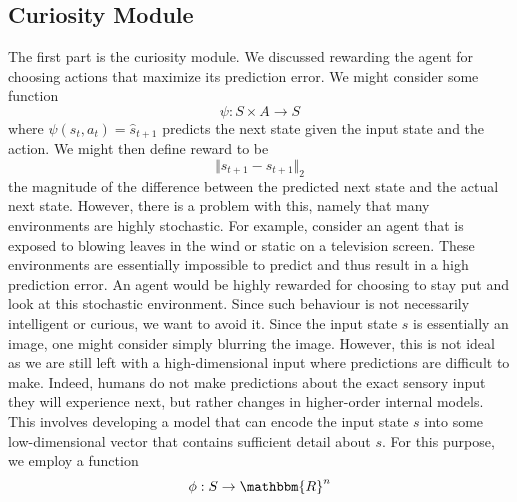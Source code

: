 \documentclass[conference, 12pt]{IEEEtran} %
\begin{document}
	\subsection{Curiosity Module}
	\par The first part is the curiosity module. We discussed rewarding the agent for choosing actions that maximize its prediction error. We might consider some function
	$$
	\psi : S \times A \to S
	$$
	where $\psi(s_t, a_t) = \hat{s}_{t+1} $ predicts the next state given the input state and the action. We might then define reward to be
	$$
	\Vert s_{t+1} - \hat{s}_{t+1} \Vert _2
	$$
	the magnitude of the difference between the predicted next state and the actual next state. However, there is a problem with this, namely that many environments are highly stochastic. For example, consider an agent that is exposed to blowing leaves in the wind or static on a television screen. These environments are essentially impossible to predict and thus result in a high prediction error. An agent would be highly rewarded for choosing to stay put and look at this stochastic environment. Since such behaviour is not necessarily intelligent or curious, we want to avoid it. Since the input state $s$ is essentially an image, one might consider simply blurring the image. However, this is not ideal as we are still left with a high-dimensional input where predictions are difficult to make. Indeed, humans do not make predictions about the exact sensory input they will experience next, but rather changes in higher-order internal models. This involves developing a model that can encode the input state $s$ into some low-dimensional vector that contains sufficient detail about $s$. For this purpose, we employ a function
	$$
	\phi : S \to \mathbbm{R}^n
	$$
\end{document}
